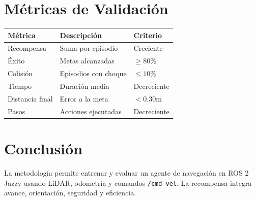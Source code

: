 \documentclass[conference]{IEEEtran}
\begin{document}
\section{Métricas de Validación}
\begin{table}[h]
\centering
\begin{tabular}{|p{2.2cm}|p{2.6cm}|p{2.2cm}|}
\hline
Métrica & Descripción & Criterio \\
\hline
Recompensa & Suma por episodio & Creciente \\
Éxito & Metas alcanzadas & $\geq 80\%$ \\
Colisión & Episodios con choque & $\leq 10\%$ \\
Tiempo & Duración media & Decreciente \\
Distancia final & Error a la meta & $<0.30$m \\
Pasos & Acciones ejecutadas & Decreciente \\
\hline
\end{tabular}
\end{table}

\section{Conclusión}
La metodología permite entrenar y evaluar un agente de navegación en ROS 2 Jazzy usando LiDAR, odometría y comandos \texttt{/cmd\_vel}. La recompensa integra avance, orientación, seguridad y eficiencia.
\end{document}
